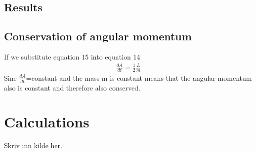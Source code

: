 \documentclass{article}
\begin{document}
\begin{multicols}{2}
\section{Results}
\subsection{Conservation of angular momentum}
If we substitute equation 15 into equation 14 
\begin{align}
    \frac{dA}{dt}=\frac{1}{2}\frac{L}{m}
\end{align}
Sine $\frac{dA}{dt}$=constant and the mass m is constant means that the angular momentum also is constant and therefore also conserved.  
\end{multicols}


\clearpage
\appendix %
\section{Calculations} 

\begin{thebibliography}{9}
	Skriv inn kilde her.
\end{thebibliography}
\end{document}
